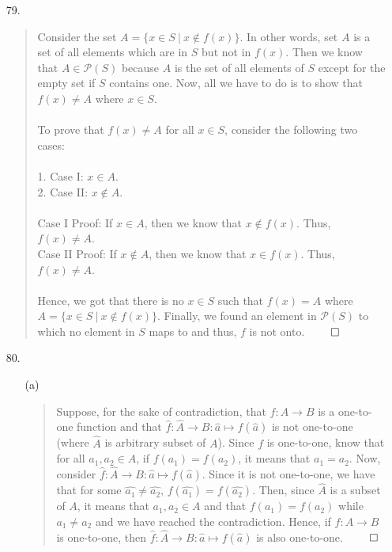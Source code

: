 \documentclass[12pt, a4paper]{article}
\begin{document}
\begin{itemize}
\item[79.]
\begin{quote}
Consider the set $A = \{x \in S \ | \ x \notin f(x)\}$. In other words, set $A$ is a set of all elements
which are in $S$ but not in $f(x)$. Then we know that $A \in \mathcal{P}(S)$ because $A$
is the set of all elements of $S$ except for the empty set if $S$ contains one.
Now, all we have to do is to show that $f(x) \neq A$ where $x \in S$.\\\\
To prove that $f(x) \neq A$ for all $x \in S$, consider the following two cases:\\\\
1. Case I: $x \in A$.\\
2. Case II: $x \notin A$.
\\\\
Case I Proof: If $x \in A$, then we know that $x \notin f(x)$. Thus, $f(x) \neq A$.\\
Case II Proof: If $x \notin A$, then we know that $x \in f(x)$. Thus, $f(x) \neq A$.\\\\
Hence, we got that there is no $x \in S$ such that $f(x) = A$ where $A = \{x \in S \ | \ x \notin f(x)\}$.
Finally, we found an element in $\mathcal{P}(S)$ to which no element in $S$ maps to and thus,
$f$ is not onto.
$\qed$
\end{quote}

\item[]
\item[]

\item[80.]
\begin{itemize}
\item[(a)]
\begin{quote}
Suppose, for the sake of contradiction, that $f : A \rightarrow B$ is a one-to-one function and that $\hat{f} : \hat{A} \rightarrow B : \hat{a} \mapsto f(\hat{a})$
is not one-to-one (where $\hat{A}$ is arbitrary subset of $A$). Since $f$ is one-to-one, know that for all $a_1, a_2 \in A$, if $f(a_1) = f(a_2)$,
it means that $a_1 = a_2$. Now, consider $\hat{f} : \hat{A} \rightarrow B : \hat{a} \mapsto f(\hat{a})$.
Since it is not one-to-one, we have that for some $\hat{a_1} \neq \hat{a_2}$, $f(\hat{a_1}) = f(\hat{a_2})$.
Then, since $\hat{A}$ is a subset of $A$, it means that $a_1, a_2 \in A$ and that $f(a_1) = f(a_2)$ while $a_1 \neq a_2$
and we have reached the contradiction. Hence, if $f : A \rightarrow B$ is one-to-one, then $\hat{f} : \hat{A} \rightarrow B : \hat{a} \mapsto f(\hat{a})$ is also one-to-one.
$\qed$
\end{quote}


\end{itemize}
\end{itemize}
\end{document}
